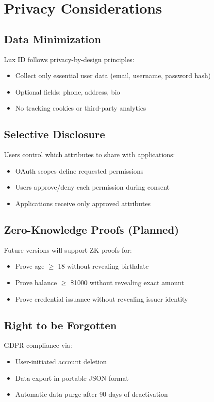 \section{Privacy Considerations}


\subsection{Data Minimization}

Lux ID follows privacy-by-design principles:
\begin{itemize}
  \item Collect only essential user data (email, username, password hash)
  \item Optional fields: phone, address, bio
  \item No tracking cookies or third-party analytics
\end{itemize}

\subsection{Selective Disclosure}

Users control which attributes to share with applications:
\begin{itemize}
  \item OAuth scopes define requested permissions
  \item Users approve/deny each permission during consent
  \item Applications receive only approved attributes
\end{itemize}

\subsection{Zero-Knowledge Proofs (Planned)}

Future versions will support ZK proofs for:
\begin{itemize}
  \item Prove age $\geq$ 18 without revealing birthdate
  \item Prove balance $\geq$ \$1000 without revealing exact amount
  \item Prove credential issuance without revealing issuer identity
\end{itemize}

\subsection{Right to be Forgotten}

GDPR compliance via:
\begin{itemize}
  \item User-initiated account deletion
  \item Data export in portable JSON format
  \item Automatic data purge after 90 days of deactivation
\end{itemize}

